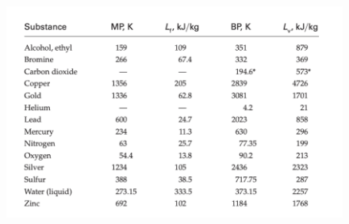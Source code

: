 \documentclass[12pt,a4paper]{article}
\begin{document}
\begin{figure}
	\centering
	\includegraphics[width=0.7\linewidth]{latentHeat2}
	\caption{}
	\label{fig:latentheat2}
\end{figure}
\end{document}
